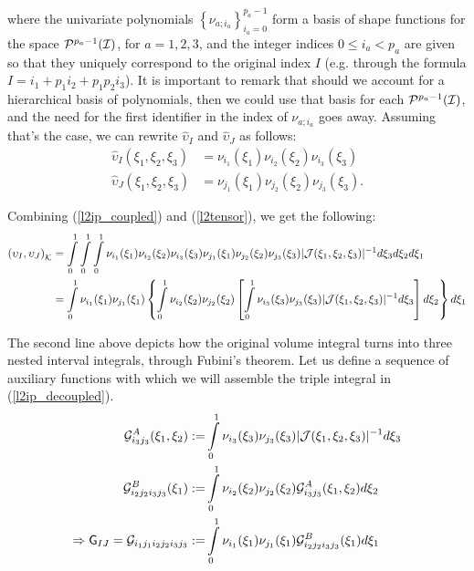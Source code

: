 \noindent where the univariate polynomials $\left\{\nu_{a;i_a}\right\}_{i_a=0}^{p_a-1}$ form a basis of shape functions for the space $\mathcal{P}^{p_a-1}(\mathcal{I})$, for $a=1,2,3$, and the integer indices $0\leq i_a<p_a$ are given so that they uniquely correspond to the original index $I$ (e.g. through the formula $I=i_1+p_1i_2+p_1p_2i_3$).
It is important to remark that should we account for a hierarchical basis of polynomials, then we could use that basis for each $\mathcal{P}^{p_a-1}(\mathcal{I})$, and the need for the first identifier in the index of $\nu_{a;i_a}$ goes away. Assuming that's the case, we can rewrite $\hat{\upsilon}_I$ and $\hat{\upsilon}_J$ as follows:
% 
\begin{equation}
    \begin{aligned}
    \hat{\upsilon}_I(\xi_1,\xi_2,\xi_3)&= \nu_{i_1}(\xi_1)\nu_{i_2}(\xi_2)\nu_{i_3}(\xi_3)\\
    \hat{\upsilon}_J(\xi_1,\xi_2,\xi_3)&= \nu_{j_1}(\xi_1)\nu_{j_2}(\xi_2)\nu_{j_3}(\xi_3).
    \end{aligned}
    \label{l2tensor}
\end{equation}

Combining (\ref{l2ip_coupled}) and (\ref{l2tensor}), we get the following:
% 
\begin{equation}
    \begin{aligned}
        \left(\upsilon_I,\upsilon_J\right)_{\mathcal{K}}&= 
             \int\limits_0^1\int\limits_0^1\int\limits_0^1\nu_{i_1}(\xi_1)\nu_{i_2}(\xi_2)\nu_{i_3}(\xi_3) \nu_{j_1}(\xi_1)\nu_{j_2}(\xi_2)\nu_{j_3}(\xi_3)|\mathcal{J}(\xi_1,\xi_2,\xi_3)|^{-1} d\xi_3d\xi_2d\xi_1 \\
        \ &= \int\limits_0^1\nu_{i_1}(\xi_1)\nu_{j_1}(\xi_1)\left\{\int\limits_0^1\nu_{i_2}(\xi_2)\nu_{j_2}(\xi_2)\left[\int\limits_0^1 \nu_{i_3}(\xi_3) \nu_{j_3}(\xi_3)|\mathcal{J}(\xi_1,\xi_2,\xi_3)|^{-1} d\xi_3\right]d\xi_2\right\}d\xi_1
    \end{aligned}
    \label{l2ip_decoupled}
\end{equation}

The second line above depicts how the original volume integral turns into three nested interval integrals, through Fubini's theorem. Let us define a sequence of auxiliary functions with which we will assemble the triple integral in (\ref{l2ip_decoupled}).
% 
\begin{align}
        \mathcal{G}_{i_3j_3}^A(\xi_1,\xi_2):=&\int\limits_0^1 \nu_{i_3}(\xi_3)\nu_{j_3}(\xi_3)|\mathcal{J}(\xi_1,\xi_2,\xi_3)|^{-1}d\xi_3  \label{GA_l2}  \\
        \mathcal{G}_{i_2j_2i_3j_3}^B(\xi_1):=&\int\limits_0^1 \nu_{i_2}(\xi_2)\nu_{j_2}(\xi_2)\mathcal{G}_{i_3j_3}^A(\xi_1,\xi_2)d\xi_2 \label{GB_l2} \\        
        \Rightarrow \mathsf{G}_{IJ}=\mathcal{G}_{i_1j_1i_2j_2i_3j_3}:=& \int\limits_0^1 \nu_{i_1}(\xi_1)\nu_{j_1}(\xi_1)\mathcal{G}_{i_2j_2i_3j_3}^B(\xi_1)d\xi_1    \label{ip_l2_GAB}
\end{align}

